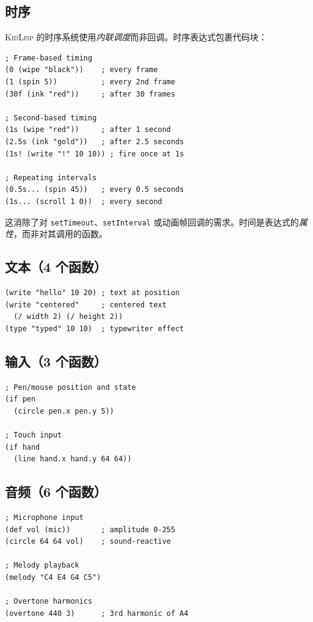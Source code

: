 \documentclass[10pt,letterpaper,twocolumn]{article}
\newcommand{\kl}{\textsc{KidLisp}}
\begin{document}
\subsection{时序}

\kl{} 的时序系统使用\emph{内联调度}而非回调。时序表达式包裹代码块：

\begin{lstlisting}
; Frame-based timing
(0 (wipe "black"))    ; every frame
(1 (spin 5))          ; every 2nd frame
(30f (ink "red"))     ; after 30 frames

; Second-based timing
(1s (wipe "red"))     ; after 1 second
(2.5s (ink "gold"))   ; after 2.5 seconds
(1s! (write "!" 10 10)) ; fire once at 1s

; Repeating intervals
(0.5s... (spin 45))   ; every 0.5 seconds
(1s... (scroll 1 0))  ; every second
\end{lstlisting}

这消除了对 \texttt{setTimeout}、\texttt{setInterval} 或动画帧回调的需求。时间是表达式的\emph{属性}，而非对其调用的函数。

\subsection{文本（4 个函数）}

\begin{lstlisting}
(write "hello" 10 20) ; text at position
(write "centered"     ; centered text
  (/ width 2) (/ height 2))
(type "typed" 10 10)  ; typewriter effect
\end{lstlisting}

\subsection{输入（3 个函数）}

\begin{lstlisting}
; Pen/mouse position and state
(if pen
  (circle pen.x pen.y 5))

; Touch input
(if hand
  (line hand.x hand.y 64 64))
\end{lstlisting}

\subsection{音频（6 个函数）}

\begin{lstlisting}
; Microphone input
(def vol (mic))       ; amplitude 0-255
(circle 64 64 vol)    ; sound-reactive

; Melody playback
(melody "C4 E4 G4 C5")

; Overtone harmonics
(overtone 440 3)      ; 3rd harmonic of A4
\end{lstlisting}
\end{document}
